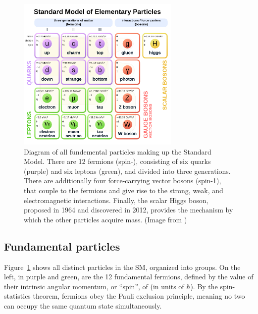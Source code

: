 \begin{figure}[ht]
  \begin{center}
    \includegraphics[width=0.70\textwidth]{figs/theory/standard_model.png}
    \caption{Diagram of all fundemental particles making up the Standard Model. There are 12 fermions (spin-), 
      consisting of six quarks (purple) and six leptons (green), 
      and divided into three generations. There are additionally four force-carrying vector bosons (spin-1),
      that couple to the fermions and give rise to the strong, weak, and electromagnetic interactions.
      Finally, the scalar Higgs boson, proposed in 1964 and discovered in 2012, provides the mechanism
      by which the other particles acquire mass. (Image from \cite{SM_diagram})
            }
    \label{fig:sm}
  \end{center}
\end{figure}

\subsection{Fundamental particles}

Figure~\ref{fig:sm} shows all distinct particles in the SM, organized into groups.
On the left, in purple and green, are the 12 fundamental fermions, defined by the
value of their intrinsic angular momentum, or ``spin'', of  (in units
of $\hbar$). By the spin-statistics theorem, fermions obey the Pauli exclusion principle,
meaning no two can occupy the same quantum state simultaneously.

